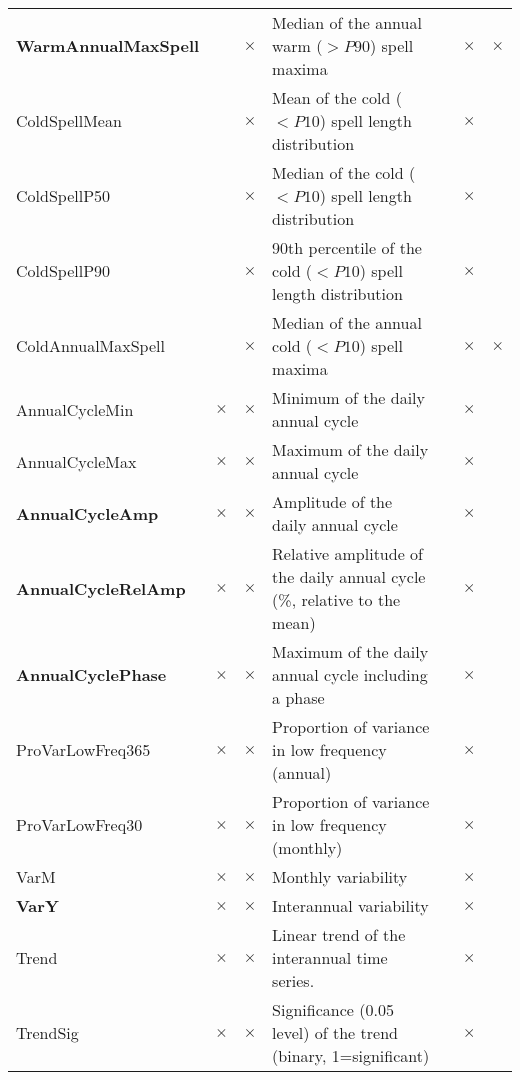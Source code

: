 \documentclass[11pt]{amsart}
\begin{document}
\begin{table}[!htb]
{\begin{tabular}{lllllll}
\textbf{WarmAnnualMaxSpell} &           & $\times$  & Median of the annual warm ($> P90$) spell maxima                & & $\times$& $\times$  \\
ColdSpellMean               &           & $\times$  & Mean of the cold ($< P10$) spell length distribution            & &  $\times$  & \\
ColdSpellP50                &           & $\times$  & Median of the cold ($< P10$) spell length distribution          & & $\times$&    \\
ColdSpellP90                &           & $\times$  & 90th percentile of the cold ($< P10$) spell length distribution & & $\times$&    \\
ColdAnnualMaxSpell          &           & $\times$  & Median of the annual cold ($< P10$) spell maxima                & & $\times$& $\times$ \\
AnnualCycleMin              & $\times$  & $\times$  & Minimum of the daily annual cycle                                         & & $\times$&    \\
AnnualCycleMax              & $\times$  & $\times$  & Maximum of the daily annual cycle                                         & & $\times$&    \\
\textbf{AnnualCycleAmp}     & $\times$  & $\times$  & Amplitude of the daily annual cycle                                       & &  $\times$  &  \\
\textbf{AnnualCycleRelAmp}  & $\times$  & $\times$  & Relative amplitude of the daily annual cycle (\%, relative to the mean)   & &  $\times$  &  \\
\textbf{AnnualCyclePhase}   & $\times$  & $\times$  & Maximum of the daily annual cycle including a phase                       & &  $\times$  &  \\
ProVarLowFreq365            & $\times$  & $\times$  & Proportion of variance in low frequency (annual)                          & & $\times$&    \\
ProVarLowFreq30             & $\times$  & $\times$  & Proportion of variance in low frequency (monthly)                         & & $\times$&    \\
VarM                        & $\times$  & $\times$  & Monthly variability                                                       &  & $\times$ &    \\
\textbf{VarY}               & $\times$  & $\times$  & Interannual variability                                                   & &  $\times$  &  \\
Trend                       & $\times$  & $\times$  & Linear trend of the interannual time series.                              & &  $\times$  &  \\
TrendSig                    & $\times$  & $\times$  & Significance (0.05 level) of the trend (binary, 1=significant)            & & $\times$ &    \\
\hline
\end{tabular}
}
\end{table}
\end{document}
